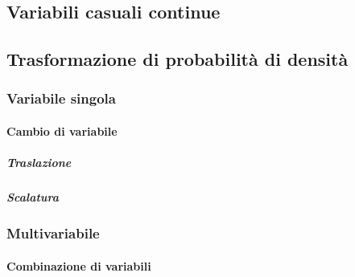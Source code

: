 \documentclass[letterpaper,10pt,italian]{jupyterBook}
\begin{document}
\subsection{Variabili casuali continue}
\label{\detokenize{ch/statistics/random_variables_continuous:variabili-casuali-continue}}\label{\detokenize{ch/statistics/random_variables_continuous:statistics-hs-random-variables-continuous}}\label{\detokenize{ch/statistics/random_variables_continuous::doc}}
\sphinxstepscope


\subsection{Trasformazione di probabilità di densità}
\label{\detokenize{ch/statistics/rv_pdf_transformations:trasformazione-di-probabilita-di-densita}}\label{\detokenize{ch/statistics/rv_pdf_transformations::doc}}

\subsubsection{Variabile singola}
\label{\detokenize{ch/statistics/rv_pdf_transformations:variabile-singola}}

\paragraph{Cambio di variabile}
\label{\detokenize{ch/statistics/rv_pdf_transformations:cambio-di-variabile}}

\subparagraph{Traslazione}
\label{\detokenize{ch/statistics/rv_pdf_transformations:traslazione}}

\subparagraph{Scalatura}
\label{\detokenize{ch/statistics/rv_pdf_transformations:scalatura}}

\subsubsection{Multi\sphinxhyphen{}variabile}
\label{\detokenize{ch/statistics/rv_pdf_transformations:multi-variabile}}

\paragraph{Combinazione di variabili}
\label{\detokenize{ch/statistics/rv_pdf_transformations:combinazione-di-variabili}}
\end{document}
